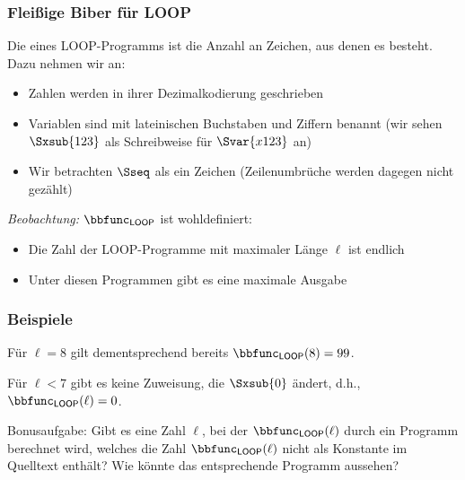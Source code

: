 \documentclass[aspectratio=1610,onlymath]{beamer}
\begin{document}
\begin{frame}\frametitle{Fleißige Biber für LOOP}

Die  eines LOOP-Programms ist die Anzahl an
Zeichen, aus denen es besteht. Dazu nehmen wir an:
\begin{itemize}
\item Zahlen werden in ihrer Dezimalkodierung geschrieben
\item Variablen sind mit lateinischen Buchstaben und Ziffern benannt (wir sehen $\Sxsub{123}$ als Schreibweise für $\Svar{x123}$ an)
\item Wir betrachten $\Sseq$ als ein Zeichen (Zeilenumbrüche werden dagegen nicht gezählt)
\end{itemize}\bigskip\pause

\pause

\emph{Beobachtung:} $\bbfunc_{\textsf{LOOP}}$ ist wohldefiniert:
\begin{itemize}
\item Die Zahl der LOOP-Programme mit maximaler Länge $\ell$ ist endlich
\item Unter diesen Programmen gibt es eine maximale Ausgabe
\end{itemize}

\end{frame}

\begin{frame}\frametitle{Beispiele}

\medskip\pause

Für $\ell=8$ gilt dementsprechend bereits $\bbfunc_{\textsf{LOOP}}(8)=99$.
\medskip

Für $\ell<7$ gibt es keine Zuweisung, die $\Sxsub{0}$ ändert, d.h., $\bbfunc_{\textsf{LOOP}}(\ell)=0$.
\bigskip\pause

\alert{Bonusaufgabe:} Gibt es eine Zahl $\ell$, bei der $\bbfunc_{\textsf{LOOP}}(\ell)$ durch ein
Programm berechnet wird, welches die Zahl $\bbfunc_{\textsf{LOOP}}(\ell)$ nicht
als Konstante im Quelltext enthält? Wie könnte das entsprechende Programm aussehen?


\end{frame}
\end{document}
